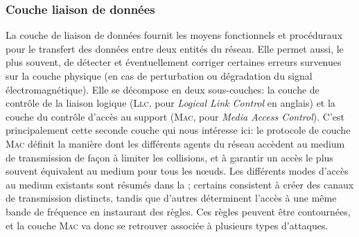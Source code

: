     \subsubsection{Couche liaison de données}
La couche de liaison de données fournit les moyens fonctionnels et procéduraux pour le transfert des données entre deux entités du réseau.
Elle permet aussi, le plus souvent, de détecter et éventuellement corriger certaines erreurs survenues sur la couche physique (en cas de perturbation ou dégradation du signal électromagnétique).
Elle se décompose en deux sous-couches: la couche de contrôle de la liaison logique (\textsc{Llc}, pour \textit{Logical Link Control} en anglais) et la couche du contrôle d'accès au support (\textsc{Mac}, pour \textit{Media Access Control}).
C'est principalement cette seconde couche qui nous intéresse ici: le protocole de couche \textsc{Mac} définit la manière dont les différents agents du réseau accèdent au medium de transmission de façon à limiter les collisions, et à garantir un accès le plus souvent équivalent au medium pour tous les nœuds.
Les différents modes d'accès au medium existants sont résumés dans la ; certains consistent à créer des canaux de transmission distincts, tandis que d'autres déterminent l'accès à une même bande de fréquence en instaurant des règles.
Ces règles peuvent être contournées, et la couche \textsc{Mac} va donc se retrouver associée à plusieurs types d'attaques.

